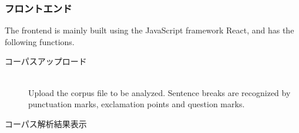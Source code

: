 \subsubsection{フロントエンド}
\label{sec:2-1-1}
The frontend is mainly built using the JavaScript framework React, and has the following functions.

\begin{description}
   \item[コーパスアップロード]\mbox{}\\
Upload the corpus file to be analyzed. Sentence breaks are recognized by punctuation marks, exclamation points
and question marks.
   \item[コーパス解析結果表示]\mbox{}\\


\end{description}
